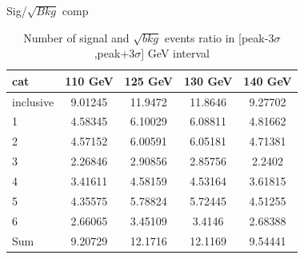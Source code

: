 \documentclass[10pt,UKenglish, leqno, xcolor = dvipsnames]{beamer}
\begin{document}
	\begin{frame}{Sig/$\sqrt{Bkg}$ comp}
		\vfill
		\begin{table}[tbp]
			\centering
			\begin{tabular}{lcccc}
				\toprule[1.5pt]
				cat & 110 GeV	& 125 GeV	& 130 GeV	& 140 GeV	\\
				\midrule
				inclusive & 9.01245 & 11.9472 & 11.8646 & 9.27702 	\\ 
				1 & 4.58345 & 6.10029 & 6.08811 & 4.81662 	\\
				2 & 4.57152 & 6.00591 & 6.05181 & 4.71381 	\\
				3 & 2.26846 & 2.90856 & 2.85756 & 2.2402 	\\
				4 & 3.41611 & 4.58159 & 4.53164 & 3.61815 	\\
				5 & 4.35575 & 5.78824 & 5.72445 & 4.51255 	\\
				6 & 2.66065 & 3.45109 & 3.4146 & 2.68388 	\\
				Sum & 9.20729 & 12.1716 & 12.1169 & 9.54441	\\
				\bottomrule[1.5pt]
			\end{tabular}
			\caption{Number of signal and $\sqrt{bkg}$ events ratio in [peak-3$\sigma$,peak+3$\sigma$] GeV interval}
		\end{table}
		\vfill
	\end{frame}
	
\end{document}
